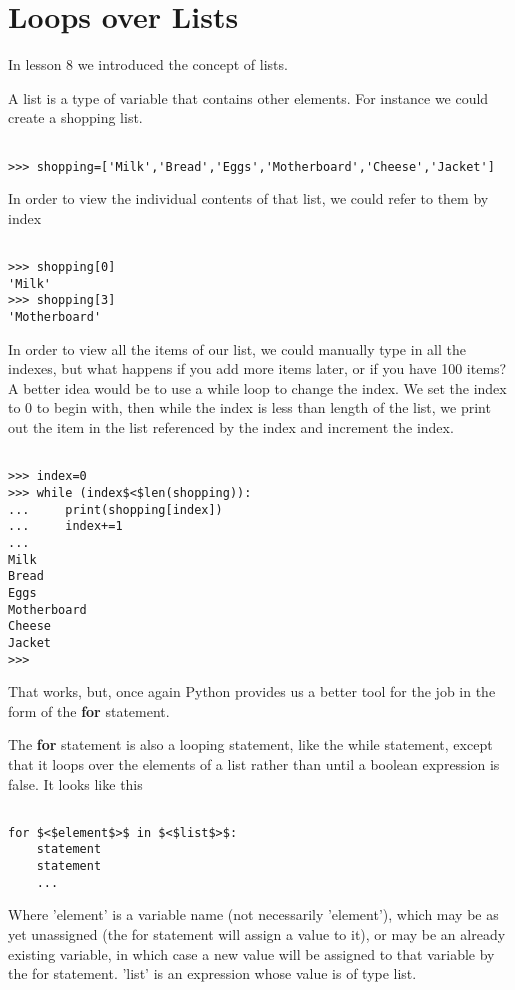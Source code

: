 
\section{Loops over Lists}

In lesson 8 we introduced the concept of lists. 

A list is a type of variable that contains other elements. For instance we could create a shopping list. 
\begin{lstlisting}

>>> shopping=['Milk','Bread','Eggs','Motherboard','Cheese','Jacket']
\end{lstlisting}

In order to view the individual contents of that list, we could refer to them by index
\begin{lstlisting}

>>> shopping[0]
'Milk'
>>> shopping[3]
'Motherboard'
\end{lstlisting}

 In order to view all the items of our list, we could manually type in all the indexes, but what happens if you add more items later, or if you have 100 items? A better idea would be to use a while loop to change the index. We set the index to 0 to begin with, then while the index is less than length of the list, we print out the item in the list referenced by the index and increment the index.
\begin{lstlisting}

>>> index=0
>>> while (index$<$len(shopping)):
...     print(shopping[index])
...     index+=1
... 
Milk
Bread
Eggs
Motherboard
Cheese
Jacket
>>> 
\end{lstlisting}

That works, but, once again Python provides us a better tool for the job in the form of   the \textbf{for} statement.

The \textbf{for} statement is also a looping statement, like the while statement, except that it loops   over the elements of a list rather than until a boolean expression is false. It looks like this
\begin{lstlisting}

for $<$element$>$ in $<$list$>$:
    statement
    statement
    ...
\end{lstlisting}

Where 'element' is a variable name (not necessarily 'element'),   which may be as yet unassigned (the for statement will assign a value   to it), or may be an already existing variable, in which case a new value   will be assigned to that variable by the for statement. 'list' is an   expression whose value is of type list.

